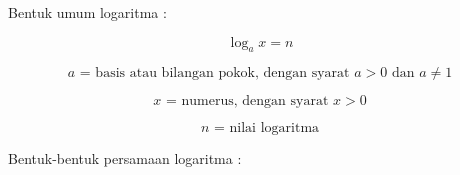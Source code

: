 \begin{eulernotebook}
\begin{eulercomment}
\begin{eulercomment}
\begin{eulercomment}
Bentuk umum logaritma :

\end{eulercomment}
\begin{eulerformula}
\[
\boxed{\log_{a} x = n}
\]
\end{eulerformula}
\begin{eulercomment}
\end{eulercomment}
\begin{eulerformula}
\[
a \text{ = basis atau bilangan pokok, dengan syarat }a > 0 \text { dan } a \neq 1
\]
\end{eulerformula}
\begin{eulerformula}
\[
x \text{ = numerus, dengan syarat } x > 0
\]
\end{eulerformula}
\begin{eulerformula}
\[
n \text{ = nilai logaritma}
\]
\end{eulerformula}
\begin{eulercomment}
Bentuk-bentuk persamaan logaritma :


\end{eulercomment}
\end{eulercomment}
\end{eulercomment}
\end{eulernotebook}
